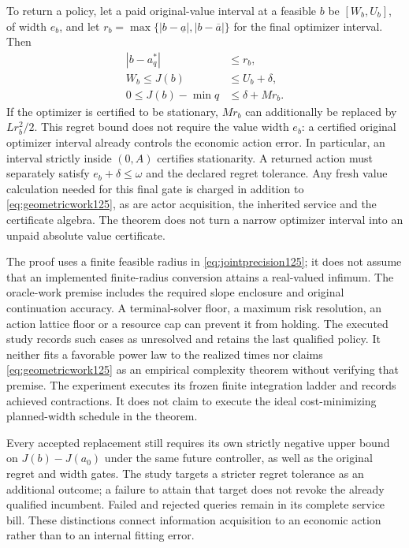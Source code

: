 \begin{theorem}
To return a policy, let a paid original-value interval at a feasible
$b$ be $[W_b,U_b]$, of width $e_b$, and let
$r_b=\max\{|b-\underline a|,|b-\overline a|\}$ for the final
optimizer interval. Then
\begin{align}
 |b-a_q^*|&\le r_b,\nonumber\\
 W_b\le J(b)&\le U_b+\delta,\nonumber\\
 0\le J(b)-\min q&\le\delta+Mr_b.
 \label{eq:terminalpolicy125}
\end{align}
If the optimizer is certified to be stationary, $Mr_b$ can additionally
be replaced by $Lr_b^2/2$. This regret bound does not require the value
width $e_b$: a certified original optimizer interval already controls
the economic action error. In particular, an interval strictly inside
$(0,A)$ certifies stationarity. A returned action must separately satisfy
$e_b+\delta\le\omega$ and the declared regret tolerance. Any fresh
value calculation needed for this final gate is charged in addition to
\eqref{eq:geometricwork125}, as are actor acquisition, the inherited
service and the certificate algebra. The theorem does not turn a narrow
optimizer interval into an unpaid absolute value certificate.
\end{theorem}

The proof uses a finite feasible radius in
\eqref{eq:jointprecision125}; it does not assume that an implemented
finite-radius conversion attains a real-valued infimum. The oracle-work
premise includes the required slope enclosure and original continuation
accuracy. A terminal-solver floor, a maximum risk resolution, an action
lattice floor or a resource cap can prevent it from holding. The executed
study records such cases as unresolved and retains the last qualified
policy. It neither fits a favorable power law to the realized times nor
claims \eqref{eq:geometricwork125} as an empirical complexity theorem
without verifying that premise.
The experiment executes its frozen finite integration ladder and records
achieved contractions. It does not claim to execute the ideal
cost-minimizing planned-width schedule in the theorem.

Every accepted replacement still requires its own strictly negative
upper bound on $J(b)-J(a_0)$ under the same future controller, as well
as the original regret and width gates. The study targets a stricter
regret tolerance as an additional outcome; a failure to attain that
target does not revoke the already qualified incumbent. Failed and
rejected queries remain in its complete service bill. These distinctions
connect information acquisition to an economic action rather than to an
internal fitting error.

